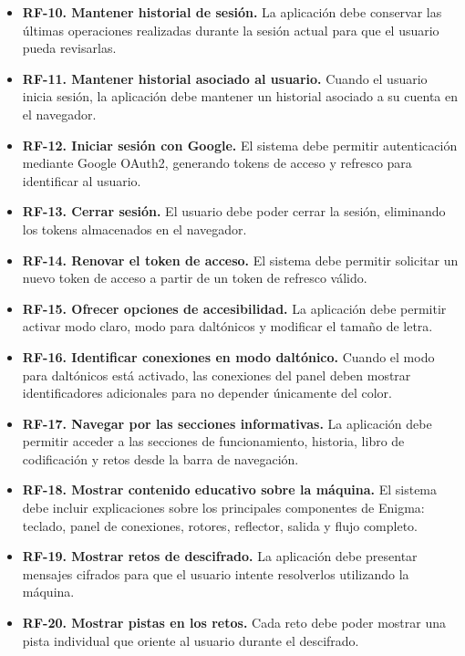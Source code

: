 \begin{itemize}
	\item \textbf{RF-10. Mantener historial de sesión.} La aplicación debe conservar las últimas operaciones realizadas durante la sesión actual para que el usuario pueda revisarlas.
	
	\item \textbf{RF-11. Mantener historial asociado al usuario.} Cuando el usuario inicia sesión, la aplicación debe mantener un historial asociado a su cuenta en el navegador.
	
	\item \textbf{RF-12. Iniciar sesión con Google.} El sistema debe permitir autenticación mediante Google OAuth2, generando tokens de acceso y refresco para identificar al usuario.
	
	\item \textbf{RF-13. Cerrar sesión.} El usuario debe poder cerrar la sesión, eliminando los tokens almacenados en el navegador.
	
	\item \textbf{RF-14. Renovar el token de acceso.} El sistema debe permitir solicitar un nuevo token de acceso a partir de un token de refresco válido.
	
	\item \textbf{RF-15. Ofrecer opciones de accesibilidad.} La aplicación debe permitir activar modo claro, modo para daltónicos y modificar el tamaño de letra.
	
	\item \textbf{RF-16. Identificar conexiones en modo daltónico.} Cuando el modo para daltónicos está activado, las conexiones del panel deben mostrar identificadores adicionales para no depender únicamente del color.
	
	\item \textbf{RF-17. Navegar por las secciones informativas.} La aplicación debe permitir acceder a las secciones de funcionamiento, historia, libro de codificación y retos desde la barra de navegación.
	
	\item \textbf{RF-18. Mostrar contenido educativo sobre la máquina.} El sistema debe incluir explicaciones sobre los principales componentes de Enigma: teclado, panel de conexiones, rotores, reflector, salida y flujo completo.
	
	\item \textbf{RF-19. Mostrar retos de descifrado.} La aplicación debe presentar mensajes cifrados para que el usuario intente resolverlos utilizando la máquina.
	
	\item \textbf{RF-20. Mostrar pistas en los retos.} Cada reto debe poder mostrar una pista individual que oriente al usuario durante el descifrado.
\end{itemize}

